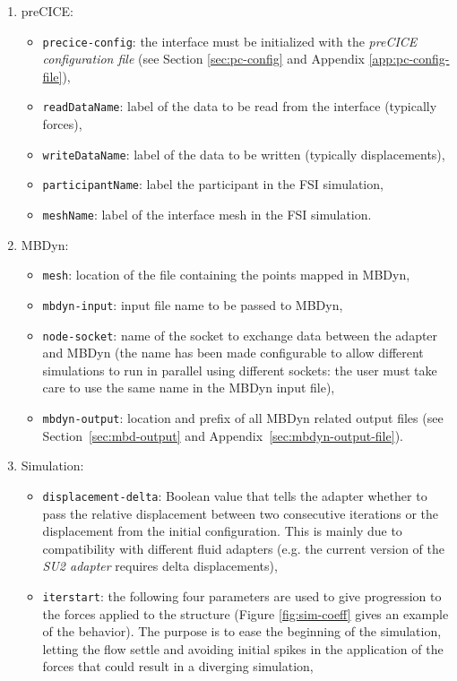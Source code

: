 \begin{enumerate}
    \item preCICE:
    \begin{itemize}
        \item \texttt{precice-config}: the interface must be initialized with the \textit{preCICE configuration file} (see Section \ref{sec:pc-config} and Appendix \ref{app:pc-config-file}),
        \item \texttt{readDataName}: label of the data to be read from the interface (typically forces),
        \item \texttt{writeDataName}: label of the data to be written (typically displacements),
        \item \texttt{participantName}: label the participant in the FSI simulation,
        \item \texttt{meshName}: label of the interface mesh in the FSI simulation.
    \end{itemize}
    \item MBDyn:
    \begin{itemize}
        \item \texttt{mesh}: location of the file containing the points mapped in MBDyn,
        \item \texttt{mbdyn-input}: input file name to be passed to MBDyn,
        \item \texttt{node-socket}: name of the socket to exchange data between the adapter and MBDyn (the name has been made configurable to allow different simulations to run in parallel using different sockets: the user must take care to use the same name in the MBDyn input file),
        \item \texttt{mbdyn-output}: location and prefix of all MBDyn related output files (see Section~\ref{sec:mbd-output} and Appendix~\ref{sec:mbdyn-output-file}).
    \end{itemize}
    \item Simulation:
    \begin{itemize}
        \item \texttt{displacement-delta}: Boolean value that tells the adapter whether to pass the relative displacement between two consecutive iterations or the displacement from the initial configuration. This is mainly due to compatibility with different fluid adapters (e.g. the current version of the \textit{SU2 adapter} requires delta displacements),  
        \item \texttt{iterstart}: the following four parameters are used to give progression to the forces applied to the structure (Figure \ref{fig:sim-coeff} gives an example of the behavior). The purpose is to ease the beginning of the simulation, letting the flow settle and avoiding initial spikes in the application of the forces that could result in a diverging simulation,

\end{itemize}
\end{enumerate}
